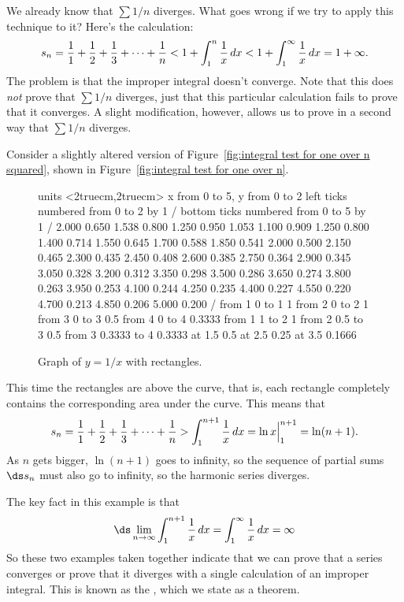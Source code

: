 We already know that $\sum 1/n$ diverges. What goes wrong if we try to
apply this technique to it? Here's the calculation:
$$
  s_n={1\over 1}+{1\over 2}+{1\over 3}+\cdots+{1\over n}
  < 1 + \int_1^n {1\over x}\,dx < 1+\int_1^\infty {1\over x}\,dx 
  =1+\infty.
$$
The problem is that the improper integral doesn't converge. Note
that this does \emph{not} prove that $\sum 1/n$ diverges, just that
this particular calculation fails to prove that it converges. A slight
modification, however, allows us to prove in a second way that $\sum
1/n$ diverges. 

Consider a slightly altered version of Figure~\ref{fig:integral
test for one over n squared}, shown in Figure~\ref{fig:integral test
for one over n}.

\begin{figure}[H]
\centerline{
\vbox{\beginpicture
\normalgraphs
\setcoordinatesystem units <2truecm,2truecm>
\setplotarea x from 0 to 5, y from 0 to 2
\axis left ticks numbered from 0 to 2 by 1 /
\axis bottom  ticks numbered from 0 to 5 by 1 /
\setquadratic
{} 2.000 0.650 1.538 0.800 1.250 0.950 1.053 1.100 0.909 
1.250 0.800 1.400 0.714 1.550 0.645 1.700 0.588 1.850 0.541 
2.000 0.500 2.150 0.465 2.300 0.435 2.450 0.408 2.600 0.385 
2.750 0.364 2.900 0.345 3.050 0.328 3.200 0.312 3.350 0.298 
3.500 0.286 3.650 0.274 3.800 0.263 3.950 0.253 4.100 0.244 
4.250 0.235 4.400 0.227 4.550 0.220 4.700 0.213 4.850 0.206 
5.000 0.200 /
\putrule from 1 0 to 1 1 
\putrule from 2 0 to 2 1
\putrule from 3 0 to 3 0.5
\putrule from 4 0 to 4 0.3333
\putrule from 1 1 to 2 1
\putrule from 2 0.5 to 3 0.5
\putrule from 3 0.3333 to 4 0.3333
{} at 1.5 0.5
 at 2.5 0.25
 at 3.5 0.1666
\endpicture}}
\caption{Graph of $y=1/x$ with rectangles.}
\label{fig:integral test for one over n}
\end{figure}

This time the rectangles are above the curve, that is, each rectangle
completely contains the corresponding area under the curve. This means
that 
$$s_n = {1\over 1}+{1\over 2}+{1\over 3}+\cdots+{1\over n}
> \int_1^{n+1} {1\over x}\,dx = \ln x\Big|_1^{n+1}=\ln(n+1).$$
As $n$ gets bigger, $\ln(n+1)$ goes to infinity, so the sequence of
partial sums $\ds s_n$ must also go to infinity, so the harmonic series
diverges. 

The key fact in this example is that
\[\ds\lim_{n\to\infty}\int_1^{n+1}\frac{1}{x}\,dx=\int_1^{\infty}\frac{1}{x}\,dx=\infty\]
So these two examples taken together indicate that we can prove that a
series converges or prove that it diverges with a single calculation
of an improper integral. This is known as the , 
which we state as a theorem.

